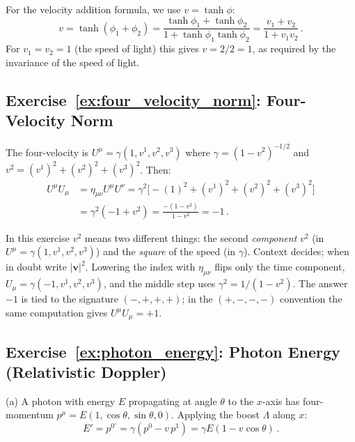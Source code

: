 For the velocity addition formula, we use $v = \tanh\phi$:
\begin{equation*}
    v = \tanh(\phi_1 + \phi_2)
    = \frac{\tanh\phi_1 + \tanh\phi_2}{1 + \tanh\phi_1\tanh\phi_2}
    = \frac{v_1 + v_2}{1 + v_1 v_2} \,.
\end{equation*}
For $v_1 = v_2 = 1$ (the speed of light) this gives $v = 2/2 = 1$, as
required by the invariance of the speed of light.

\subsection*{Exercise~\ref{ex:four_velocity_norm}: Four-Velocity Norm}

The four-velocity is $U^\mu = \gamma(1, v^1, v^2, v^3)$ where
$\gamma = (1 - v^2)^{-1/2}$ and $v^2 = (v^1)^2 + (v^2)^2 + (v^3)^2$.
Then:
\begin{align*}
    U^\mu U_\mu &= \eta_{\mu\nu} U^\mu U^\nu
    = \gamma^2\bigl[-(1)^2 + (v^1)^2 + (v^2)^2 + (v^3)^2\bigr] \\
    &= \gamma^2(-1 + v^2)
    = \frac{-(1 - v^2)}{1 - v^2}
    = \boxed{-1} \,.
\end{align*}

\begin{annotation}
In this exercise $v^2$ means two different things: the second \emph{component} $v^2$ (in
$U^\mu = \gamma(1, v^1, v^2, v^3)$) and the \emph{square} of the speed (in $\gamma$). Context
decides; when in doubt write $|\mathbf v|^2$. Lowering the index with $\eta_{\mu\nu}$ flips only
the time component, $U_\mu = \gamma(-1, v^1, v^2, v^3)$, and the middle step uses
$\gamma^2 = 1/(1 - v^2)$. The answer $-1$ is tied to the signature $(-,+,+,+)$; in the
$(+,-,-,-)$ convention the same computation gives $U^\mu U_\mu = +1$.
\end{annotation}

\subsection*{Exercise~\ref{ex:photon_energy}: Photon Energy (Relativistic Doppler)}

(a) A photon with energy $E$ propagating at angle $\theta$ to the
$x$-axis has four-momentum $p^\mu = E(1, \cos\theta, \sin\theta, 0)$.
Applying the boost $\Lambda$ along $x$:
\begin{equation*}
    E' = p^{0'} = \gamma(p^0 - v\,p^1) = \gamma E(1 - v\cos\theta) \,.
\end{equation*}

